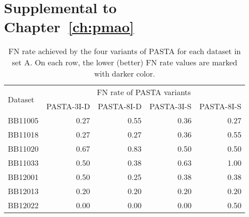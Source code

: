 \section{Supplemental to Chapter~\ref{ch:pmao}}

\begin{table}[!htbp]
	\centering
	\small
	\caption{FN rate achieved by the four variants of PASTA for each dataset in set A. On each row, the lower (better) FN rate values are marked with darker color.}
	\begin{tabular}{|l|r|r|r|r|}
		\hline
		\multirow{2}{*}{Dataset} & \multicolumn{4}{c|}{FN rate of PASTA variants } \\
		\cline{2-5}          & \multicolumn{1}{l|}{PASTA-3I-D} & \multicolumn{1}{l|}{PASTA-8I-D} & \multicolumn{1}{l|}{PASTA-3I-S} & \multicolumn{1}{l|}{PASTA-8I-S} \\
		\hline
		BB11005 & \cellcolor[rgb]{ .384,  .745,  .478}0.27 & \cellcolor[rgb]{ .988,  1,  .992}0.55 & \cellcolor[rgb]{ .584,  .827,  .647}0.36 & \cellcolor[rgb]{ .384,  .745,  .478}0.27 \\
		\hline
		BB11018 & \cellcolor[rgb]{ .384,  .745,  .478}0.27 & \cellcolor[rgb]{ .384,  .745,  .478}0.27 & \cellcolor[rgb]{ .584,  .827,  .647}0.36 & \cellcolor[rgb]{ .988,  1,  .992}0.55 \\
		\hline
		BB11020 & \cellcolor[rgb]{ .686,  .871,  .733}0.67 & \cellcolor[rgb]{ .988,  1,  .992}0.83 & \cellcolor[rgb]{ .384,  .745,  .478}0.50 & \cellcolor[rgb]{ .384,  .745,  .478}0.50 \\
		\hline
		BB11033 & \cellcolor[rgb]{ .502,  .796,  .58}0.50 & \cellcolor[rgb]{ .384,  .745,  .478}0.38 & \cellcolor[rgb]{ .624,  .847,  .682}0.63 & \cellcolor[rgb]{ .988,  1,  .992}1.00 \\
		\hline
		BB12001 & \cellcolor[rgb]{ .988,  1,  .992}0.50 & \cellcolor[rgb]{ .384,  .745,  .478}0.25 & \cellcolor[rgb]{ .686,  .871,  .733}0.38 & \cellcolor[rgb]{ .686,  .871,  .733}0.38 \\
		\hline
		BB12013 & \cellcolor[rgb]{ .988,  1,  .992}0.20 & \cellcolor[rgb]{ .988,  1,  .992}0.20 & \cellcolor[rgb]{ .988,  1,  .992}0.20 & \cellcolor[rgb]{ .988,  1,  .992}0.20 \\
		\hline
		BB12022 & \cellcolor[rgb]{ .384,  .745,  .478}0.00 & \cellcolor[rgb]{ .384,  .745,  .478}0.00 & \cellcolor[rgb]{ .384,  .745,  .478}0.00 & \cellcolor[rgb]{ .988,  1,  .992}0.50 \\
		\hline

\end{tabular}
\end{table}
